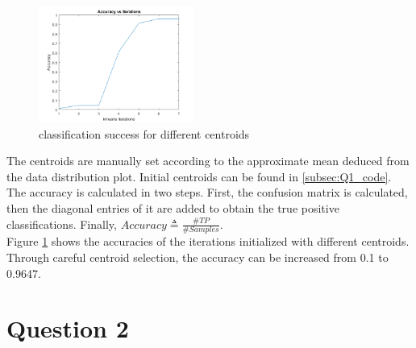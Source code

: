\documentclass[11pt]{extarticle}
\begin{document}
\begin{center}
    \begin{figure}[h]
        \includegraphics[width = 2in, height = 1.5in]{Q1_acc.png}
        \caption{classification success for different centroids}
        \label{fig:q1_2fig}
    \end{figure}
\end{center}

The centroids are manually set according to the approximate mean deduced from the data distribution plot. Initial centroids
can be found in \ref{subsec:Q1_code}. The accuracy is calculated in two steps. First, the confusion matrix is calculated, then the diagonal entries of it are added to obtain the true positive classifications. Finally, $Accuracy \triangleq \frac{\#TP}{\#Samples}$.
\\
Figure \ref{fig:q1_2fig} shows the accuracies of the iterations initialized with different centroids. Through careful centroid selection, the accuracy can be increased from 0.1 to 0.9647.

\pagebreak

\section{Question 2}
\end{document}
